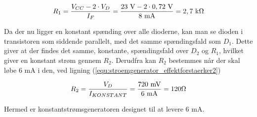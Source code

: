 \begin{equation}
\label{equ:stroemgenerator_effektforstaerker1}
R_{1} = \frac{V_{CC} - 2 \cdot V_D}{I_F} = \mathrm{\frac{23~V - 2 \cdot 0,72~V}{8~mA} = 2,7~k\ohm}
\end{equation}

Da der nu ligger en konstant spænding over alle dioderne, kan man se dioden i transistoren som siddende parallelt, med det samme spændingsfald som $D_1$. Dette giver at der findes det samme, konstante, spændingsfald over $D_2$ og $R_{1}$, hvilket giver en konstant strøm gennem $R_{2}$. Derudfra kan $R_{2}$ bestemmes når der skal løbe 6 mA i den, ved ligning (\ref{equ:stroemgenerator_effektforstaerker2})

\begin{equation}
\label{equ:stroemgenerator_effektforstaerker2}
R_{2} = \frac{V_{D}}{I_{KONSTANT}} = \mathrm{\frac{720~mV}{6~mA} = 120\ohm}
\end{equation}

Hermed er konstantstrømsgeneratoren designet til at levere 6 mA.
